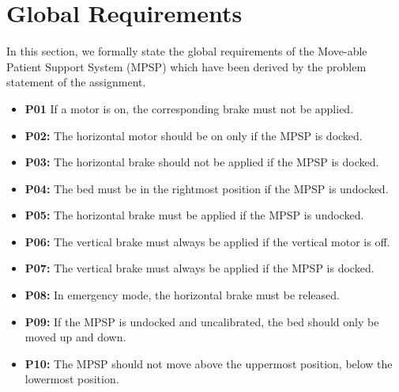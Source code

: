 \label{task1}
\section{Global Requirements}

In this section, we formally state the global requirements of the Move-able Patient Support System (MPSP) which have been derived by the problem statement of the assignment. 
\begin{itemize}
    \item \textbf{P01} If a motor is on, the corresponding brake must not be applied. \\
    \item \textbf{P02:} The horizontal motor should be on only if the MPSP is docked. \\ 
    \item \textbf{P03:} The horizontal brake should not be applied if the MPSP is docked. \\ 
    \item \textbf{P04:} The bed must be in the rightmost position if the MPSP is  undocked. \\ 
    \item \textbf{P05:} The horizontal brake must be applied if the MPSP is undocked. \\
    \item \textbf{P06:} The vertical brake must always be applied if the vertical motor is off. \\
    \item \textbf{P07:} The vertical brake must always be applied if the MPSP is docked. \\ 
    \item \textbf{P08:} In emergency mode, the horizontal brake must be released. \\
    \item \textbf{P09:} If the MPSP is undocked and uncalibrated, the bed should only be moved up and down. \\
    \item \textbf{P10:} The MPSP should not move above the uppermost position, below the lowermost position. \\
\end{itemize}

